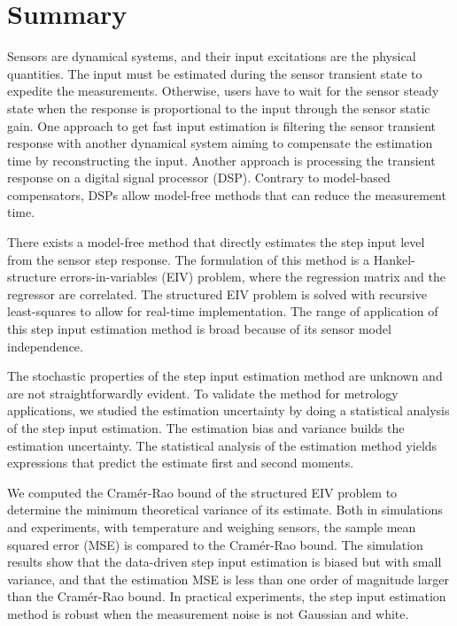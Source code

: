 \chapter{Summary} \label{chap:Summary}

\vspace{-1.2cm}

Sensors are dynamical systems, and their input excitations are the physical quantities. 
The input must be estimated during the sensor transient state to expedite the measurements. 
Otherwise, users have to wait for the sensor steady state when the response is proportional to the input through the sensor static gain. 
One approach to get fast input estimation is filtering the sensor transient response with another dynamical system aiming to compensate the estimation time by reconstructing the input. 
Another approach is processing the transient response on a digital signal processor (DSP). 
Contrary to model-based compensators, DSPs allow model-free methods that can reduce the measurement time.

There exists a model-free method that directly estimates the step input level from the sensor step response. 
The formulation of this method is a Hankel-structure errors-in-variables (EIV) problem, where the regression matrix and the regressor are correlated.
The structured EIV problem is solved with recursive least-squares to allow for real-time implementation.
The range of application of this step input estimation method is broad because of its sensor model independence.

The stochastic properties of the step input estimation method are unknown and are not straightforwardly evident.
To validate the method for metrology applications, we studied the estimation uncertainty by doing a statistical analysis of the step input estimation.
The estimation bias and variance builds the estimation uncertainty.
The statistical analysis of the estimation method yields expressions that predict the estimate first and second moments.

We computed the Cram\'er-Rao bound of the structured EIV problem to determine the minimum theoretical variance of its estimate.
Both in simulations and experiments, with temperature and weighing sensors, the sample mean squared error (MSE) is compared to the Cram\'er-Rao bound.
The simulation results show that the data-driven step input estimation is biased but with small variance, and that the estimation MSE is less than one order of magnitude larger than the Cram\'er-Rao bound.
In practical experiments, the step input estimation method is robust when the measurement noise is not Gaussian and white.

